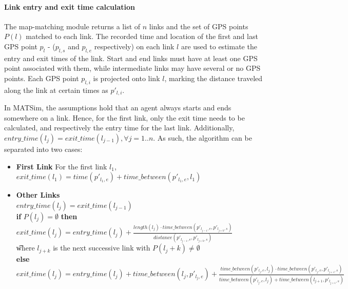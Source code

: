 \paragraph{Link entry and exit time calculation}
The map-matching module returns a list of $n$ links and the set of GPS points $P(l)$ matched to each link.
The recorded time and location of the first and last GPS point $p_{l}$ - ($p_{l,s}$ and $p_{l,e}$ respectively) on each link $l$ are used to estimate the entry and exit times of the link. 
Start and end links must have at least one GPS point associated with them, while intermediate links may have several or no GPS points. 
Each GPS point $p_{l,i}$ is projected onto link $l$, marking the distance traveled along the link at certain times as $p'_{l,i}$.


In MATSim, the assumptions hold that an agent always starts and ends somewhere on a link.
Hence, for the first link, only the exit time needs to be calculated, and respectively the entry time for the last link.
Additionally, $entry\_time(l_{j}) = exit\_time(l_{j-1}),  \forall j = 1..n$.
As such, the algorithm can be separated into two cases:
\begin{itemize}
	\item \textbf{First Link} For the first link $l_1$, $exit\_time(l_1) = time(p'_{l_1,e}) + time\_between(p'_{l_1,e}, l_1)$
	\item \textbf{Other Links} \\
		$entry\_time(l_{j}) = exit\_time(l_{j-1}) $ \\
		\textbf{if} $P(l_j) = \emptyset$ \textbf{then} $exit\_time(l_j) = entry\_time(l_j) + 
										\frac{length(l_j) \cdot time\_between(p'_{l_{j-1},e}, p'_{l_{j+k},s})}{distance(p'_{l_{j-1},e}, p'_{l_{j+k},s})} $ \\
										\t where $l_{j+k}$ is the next successive link with $P(l_j+k) \neq \emptyset$  \\
		\textbf{else}  $exit\_time(l_j) = entry\_time(l_j) + time\_between(l_{j}, p'_{l_j,e}) + \frac{time\_between(p'_{l_j,e}, l_{j}) \cdot time\_between(p'_{l_j,e}, p'_{l_{j+1},s})} 
					{time\_between(p'_{l_j,e}, l_{j}) + time\_between(l_{j+1},p'_{l_{j+1},s})}   $ \\
\end{itemize}

